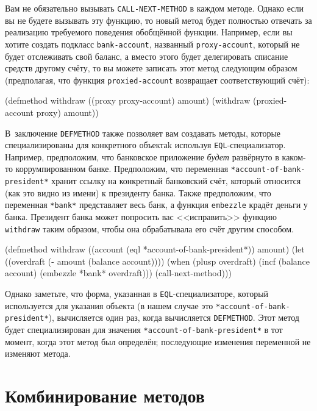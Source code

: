 Вам не обязательно вызывать \lstinline{CALL-NEXT-METHOD} в каждом методе.  Однако если вы не
будете вызывать эту функцию, то новый метод будет полностью отвечать за реализацию
требуемого поведения обобщённой функции.  Например, если вы хотите создать подкласс
\lstinline{bank-account}, названный \lstinline{proxy-account}, который не будет отслеживать свой
баланс, а вместо этого будет делегировать списание средств другому счёту, то вы можете
записать этот метод следующим образом (предполагая, что функция \lstinline{proxied-account}
возвращает соответствующий счёт):

\begin{myverb}
(defmethod withdraw ((proxy proxy-account) amount)
  (withdraw (proxied-account proxy) amount))
\end{myverb}

В~заключение \lstinline{DEFMETHOD} также позволяет вам создавать методы, которые
специализированы для конкретного объектаk используя \lstinline{EQL}-специализатор.  Например,
предположим, что банковское приложение \textit{будет} развёрнуто в каком-то
коррумпированном банке.  Предположим, что переменная \lstinline{*account-of-bank-president*}
хранит ссылку на конкретный банковский счёт, который относится (как это видно из имени) к
президенту банка.  Также предположим, что переменная \lstinline{*bank*} представляет весь банк,
а функция \lstinline{embezzle} крадёт деньги у банка.  Президент банка может попросить вас
<<исправить>> функцию \lstinline{withdraw} таким образом, чтобы она обрабатывала его счёт
другим способом.

\begin{myverb}
(defmethod withdraw ((account (eql *account-of-bank-president*)) amount)
  (let ((overdraft (- amount (balance account))))
    (when (plusp overdraft)
      (incf (balance account) (embezzle *bank* overdraft)))
  (call-next-method)))
\end{myverb}

Однако заметьте, что форма, указанная в \lstinline{EQL}-специализаторе, который используется
для указания объекта (в нашем случае это \lstinline{*account-of-bank-president*}), вычисляется
один раз, когда вычисляется \lstinline{DEFMETHOD}.  Этот метод будет специализирован для
значения \lstinline{*account-of-bank-president*} в тот момент, когда этот метод был определён;
последующие изменения переменной не изменяют метода.

\section{Комбинирование методов}

